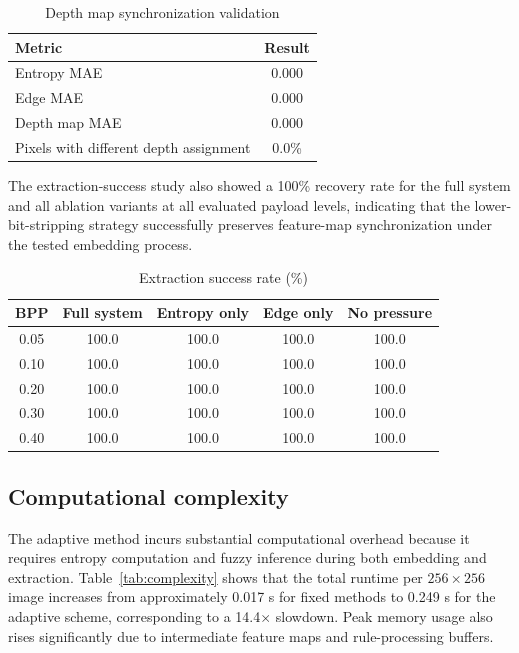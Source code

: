 \begin{table}[H]
\centering
\caption{Depth map synchronization validation}
\label{tab:sync}
\begin{tabular}{lc}
\toprule
Metric & Result \\
\midrule
Entropy MAE & 0.000 \\
Edge MAE & 0.000 \\
Depth map MAE & 0.000 \\
Pixels with different depth assignment & 0.0\% \\
\bottomrule
\end{tabular}
\end{table}

The extraction-success study also showed a 100\% recovery rate for the full system and all ablation variants at all evaluated payload levels, indicating that the lower-bit-stripping strategy successfully preserves feature-map synchronization under the tested embedding process.

\begin{table}[H]
\centering
\caption{Extraction success rate (\%)}
\label{tab:extraction}
\begin{tabular}{ccccc}
\toprule
BPP & Full system & Entropy only & Edge only & No pressure \\
\midrule
0.05 & 100.0 & 100.0 & 100.0 & 100.0 \\
0.10 & 100.0 & 100.0 & 100.0 & 100.0 \\
0.20 & 100.0 & 100.0 & 100.0 & 100.0 \\
0.30 & 100.0 & 100.0 & 100.0 & 100.0 \\
0.40 & 100.0 & 100.0 & 100.0 & 100.0 \\
\bottomrule
\end{tabular}
\end{table}

\subsection{Computational complexity}
The adaptive method incurs substantial computational overhead because it requires entropy computation and fuzzy inference during both embedding and extraction. Table~\ref{tab:complexity} shows that the total runtime per \(256 \times 256\) image increases from approximately 0.017 s for fixed methods to 0.249 s for the adaptive scheme, corresponding to a 14.4\(\times\) slowdown. Peak memory usage also rises significantly due to intermediate feature maps and rule-processing buffers.

